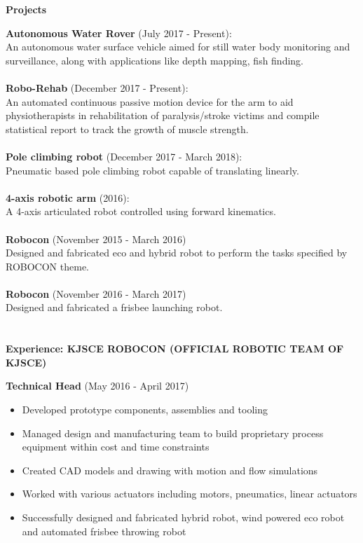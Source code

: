 \documentclass[letterpaper,11pt]{article}
\newcommand{\SmallSep}{\vspace{0.5em}}
\newcommand{\CVSection}[1]
{\Large\textbf{#1}\par
	\SmallSep\normalsize\normalfont}
\begin{document}
\CVSection{Projects}

\textbf{Autonomous Water Rover} (July 2017 - Present): \\
An autonomous water surface vehicle aimed for still water body monitoring and surveillance, along with applications like depth mapping, fish finding.  \\

\textbf{}  \\
\textbf{Robo-Rehab} (December 2017 - Present): \\
An automated continuous passive motion device for the arm to aid physiotherapists in rehabilitation of paralysis/stroke victims and compile statistical report to track the growth of muscle strength.
\textbf{}  \\
\textbf{}  \\

\textbf{Pole climbing robot} (December 2017 - March 2018): \\
Pneumatic based pole climbing robot capable of translating linearly.
\textbf{}  \\
\textbf{}  \\


\textbf{4-axis robotic arm} (2016): \\
A 4-axis articulated robot controlled using forward kinematics.
\textbf{}  \\
\textbf{}  \\


\textbf{Robocon} (November 2015 - March 2016)\\
Designed and fabricated eco and hybrid robot to perform the tasks specified by ROBOCON theme.
\textbf{}  \\
\textbf{}  \\


\textbf{Robocon} (November 2016 - March 2017)\\
Designed and fabricated a frisbee launching robot.
\textbf{}  \\
\textbf{}  \\
\textbf{}  \\

\CVSection{Experience: KJSCE ROBOCON (OFFICIAL ROBOTIC TEAM OF KJSCE)}
\textbf{Technical Head} (May 2016 - April 2017) \\


\begin{itemize}
	\item Developed prototype components, assemblies and tooling
	\item Managed design and manufacturing team to build proprietary process equipment within cost and time constraints
	\item  Created CAD models and drawing with motion and flow simulations
	\item Worked with various actuators including motors, pneumatics, linear actuators 
	\item Successfully designed and fabricated hybrid robot, wind powered eco robot and automated frisbee throwing robot
\end{itemize}
\textbf{}  \\
\end{document}

